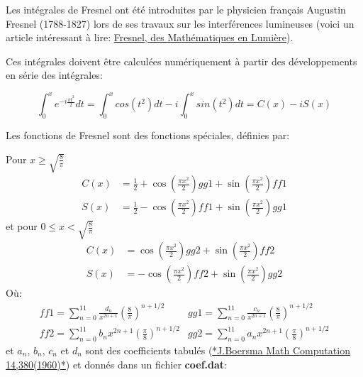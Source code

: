 \documentclass[%
oneside,                 %
final,                   %
10pt,french]{article}
\newenvironment{doconceexercise}{}{}
\newcounter{doconceexercisecounter}
\begin{document}


\begin{doconceexercise}



Les intégrales de Fresnel ont été introduites par le physicien français Augustin Fresnel (1788-1827) lors de ses travaux sur les interférences lumineuses (voici un article intéressant à lire: \href{{http://www.mathouriste.eu/Fresnel/Fresnel.html}}{Fresnel, des Mathématiques en Lumière}).

Ces intégrales doivent être calculées numériquement à partir des développements en série des intégrales:

$$\int_{0}^{x} e^{-i\frac{\pi t^{2}}{2}} dt = \int_{0}^{x} cos(t^2) dt -i \int_{0}^{x} sin(t^2) dt= C(x) -i S(x)$$

Les fonctions de Fresnel sont des fonctions spéciales, définies par:

Pour $x \geq \sqrt{\frac{8}{\pi}}$
\begin{equation*}
\begin{aligned}
C(x) &= \frac{1}{2} + \cos\left(\frac{\pi x^{2}}{2}\right) gg1 + \sin\left(\frac{\pi x^{2}}{2}\right) ff1\\
S(x) &=  \frac{1}{2} - \cos\left(\frac{\pi x^{2}}{2}\right) ff1 + \sin\left(\frac{\pi x^{2}}{2}\right) gg1
\end{aligned}
\end{equation*}
et pour $0 \leq x < \sqrt{\frac{8}{\pi}}$
\begin{equation*}
\begin{aligned}
C(x) &= \cos\left(\frac{\pi x^{2}}{2}\right) gg2 + \sin\left(\frac{\pi x^{2}}{2}\right) ff2 \\
S(x) &= - \cos\left(\frac{\pi x^{2}}{2}\right) ff2 + \sin\left(\frac{\pi x^{2}}{2}\right) gg2
\end{aligned}
\end{equation*}
Où:
\begin{equation*}
\begin{aligned}
ff1 = \sum\limits_{n=0}^{11} \frac{d_{n}}{x^{2n+1}}\left(\frac{8}{\pi}\right)^{n+1/2} & gg1 = \sum\limits_{n=0}^{11} \frac{c_{n}}{x^{2n+1}}\left(\frac{8}{\pi}\right)^{n+1/2}\\
ff2 = \sum\limits_{n=0}^{11} b_{n}x^{2n+1}\left(\frac{\pi}{8}\right)^{n+1/2} & gg2 = \sum\limits_{n=0}^{11} a_{n}x^{2n+1}\left(\frac{\pi}{8}\right)^{n+1/2}
\end{aligned}
\end{equation*}
et $a_n$, $b_n$, $c_n$ et $d_n$ sont des coefficients tabulés  (\href{{https://www.ams.org/journals/mcom/1960-14-072/S0025-5718-1960-0121973-3/S0025-5718-1960-0121973-3.pdf}}{*J.Boersma Math Computation 14,380(1960)*}) et donnés dans un fichier \textbf{coef.dat}:


\end{doconceexercise}
\end{document}
